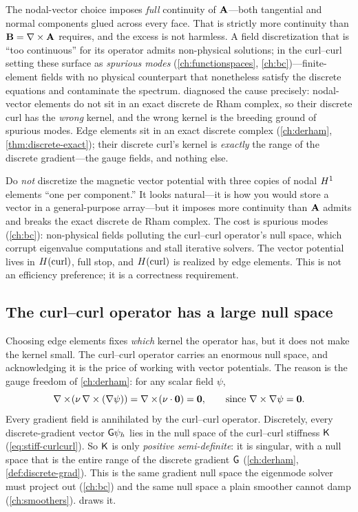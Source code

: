 The nodal-vector choice imposes \emph{full} continuity of $\mathbf{A}$---both tangential
and normal components glued across every face. That is strictly more continuity
than $\mathbf{B}=\nabla\times\mathbf{A}$ requires, and the excess is not harmless. A field
discretization that is ``too continuous'' for its operator admits non-physical
solutions; in the curl--curl setting these surface as \emph{spurious modes}
(\cref{ch:functionspaces}, \cref{ch:bc})---finite-element fields with no physical
counterpart that nonetheless satisfy the discrete equations and contaminate the
spectrum.  diagnosed the cause precisely: nodal-vector elements do
not sit in an exact discrete de Rham complex, so their discrete curl has the
\emph{wrong} kernel, and the wrong kernel is the breeding ground of spurious modes.
Edge elements sit in an exact discrete complex (\cref{ch:derham},
\cref{thm:discrete-exact}); their discrete curl's kernel is \emph{exactly} the range
of the discrete gradient---the gauge fields, and nothing else.

\begin{pitfall}
Do \emph{not} discretize the magnetic vector potential with three copies of nodal
$H^1$ elements ``one per component.'' It looks natural---it is how you would store
a vector in a general-purpose array---but it imposes more continuity than $\mathbf{A}$
admits and breaks the exact discrete de Rham complex. The cost is spurious modes
(\cref{ch:bc}): non-physical fields polluting the curl--curl operator's null space,
which corrupt eigenvalue computations and stall iterative solvers. The vector
potential lives in $H(\mathrm{curl})$, full stop, and $H(\mathrm{curl})$ is realized by edge elements.
This is not an efficiency preference; it is a correctness requirement.
\end{pitfall}

\subsection{The curl--curl operator has a large null space}
\label{sec:nullspace}

Choosing edge elements fixes \emph{which} kernel the operator has, but it does not
make the kernel small. The curl--curl operator carries an enormous null space, and
acknowledging it is the price of working with vector potentials. The reason is the
gauge freedom of \cref{ch:derham}: for any scalar field $\psi$,
\[
  \nabla\times\!\left(\nu\,\nabla\times(\nabla\psi)\right) = \nabla\times\!\left(\nu\cdot\mathbf 0\right)
  = \mathbf 0,
  \qquad\text{since } \nabla\times\nabla\psi = \mathbf 0 .
\]
Every gradient field is annihilated by the curl--curl operator. Discretely, every
discrete-gradient vector $\mathsf{G}\psi_h$ lies in the null space of the curl--curl
stiffness $\mathsf{K}$ (\cref{eq:stiff-curlcurl}). So $\mathsf{K}$ is only \emph{positive
semi-definite}: it is singular, with a null space that is the entire range of the
discrete gradient $\mathsf{G}$ (\cref{ch:derham}, \cref{def:discrete-grad}). This is
the same gradient null space the eigenmode solver must project out
(\cref{ch:bc}) and the same null space a plain smoother cannot damp
(\cref{ch:smoothers}).  draws it.

